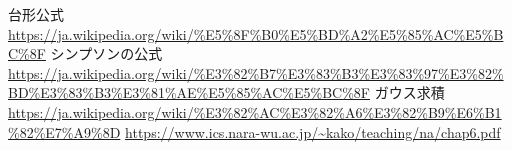 \documentclass[dvipdfmx]{jsarticle}
\begin{document}
\begin{thebibliography}{10}
   台形公式
  \url{https://ja.wikipedia.org/wiki/%E5%8F%B0%E5%BD%A2%E5%85%AC%E5%BC%8F}
   シンプソンの公式
  \url{https://ja.wikipedia.org/wiki/%E3%82%B7%E3%83%B3%E3%83%97%E3%82%BD%E3%83%B3%E3%81%AE%E5%85%AC%E5%BC%8F}
   ガウス求積
  \url{https://ja.wikipedia.org/wiki/%E3%82%AC%E3%82%A6%E3%82%B9%E6%B1%82%E7%A9%8D}
  \url{https://www.ics.nara-wu.ac.jp/~kako/teaching/na/chap6.pdf}

\end{thebibliography}
\end{document}
